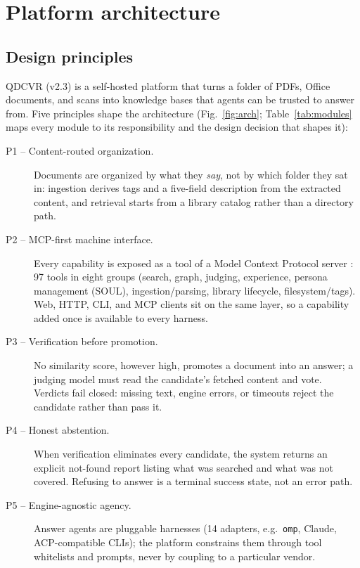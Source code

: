 \section{Platform architecture}
\label{sec:system}

\subsection{Design principles}
QDCVR (v2.3) is a self-hosted platform that turns a folder of PDFs, Office
documents, and scans into knowledge bases that agents can be trusted to
answer from. Five principles shape the architecture (Fig.~\ref{fig:arch};
Table~\ref{tab:modules} maps every module to its responsibility and the
design decision that shapes it):

\begin{description}
\item[P1 -- Content-routed organization.] Documents are organized by what
they \emph{say}, not by which folder they sat in: ingestion derives tags and
a five-field description from the extracted content, and retrieval starts
from a library catalog rather than a directory path.
\item[P2 -- MCP-first machine interface.] Every capability is exposed as a
tool of a Model Context Protocol server \cite{mcp}: 97 tools in eight groups
(search, graph, judging, experience, persona management (SOUL),
ingestion/\allowbreak parsing, library lifecycle, filesystem/\allowbreak tags). Web, HTTP, CLI, and MCP clients sit on
the same layer, so a capability added once is available to every harness.
\item[P3 -- Verification before promotion.] No similarity score, however
high, promotes a document into an answer; a judging model must read the
candidate's fetched content and vote. Verdicts fail closed: missing text,
engine errors, or timeouts reject the candidate rather than pass it.
\item[P4 -- Honest abstention.] When verification eliminates every
candidate, the system returns an explicit not-found report listing what was
searched and what was not covered. Refusing to answer is a terminal success
state, not an error path.
\item[P5 -- Engine-agnostic agency.] Answer agents are pluggable harnesses
(14 adapters, e.g.\ \texttt{omp}, Claude, ACP-compatible CLIs); the platform
constrains them through tool whitelists and prompts, never by coupling to a
particular vendor.
\end{description}

